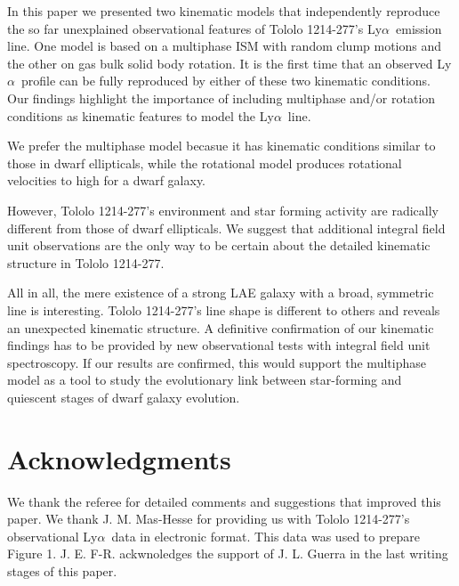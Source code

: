 \documentclass[a4,useAMS,usenatbib,usegraphicx]{mn2e}
\newcommand{\tol}{Tololo 1214-277}
\newcommand{\lya}{Ly$\alpha$}
\begin{document}
In this paper we presented two kinematic models that independently
reproduce the so far unexplained observational features of \tol's
\lya\ emission line.  
One model is based on a multiphase ISM with random clump motions and
the other on gas bulk solid body rotation. 
It is the first time that an observed \lya\ profile can be fully
reproduced by either of these two kinematic conditions.
Our findings highlight the importance of including multiphase and/or
rotation conditions as kinematic features to model the \lya\ line.

We prefer the multiphase model becasue it has kinematic
conditions similar to those in dwarf ellipticals, while the
rotational model produces rotational velocities to high for a dwarf
galaxy.  

However, \tol's environment and star forming activity are radically
different from those of dwarf ellipticals.
We suggest that additional integral field unit observations are the
only way to be certain about the detailed kinematic structure in \tol.

All in all, the mere existence of a strong LAE galaxy with a broad,
symmetric line is interesting. 
\tol's line shape is different to others and reveals an unexpected
kinematic structure.
A definitive confirmation of our kinematic findings has
to be provided by new observational tests with integral field unit
spectroscopy. 
If our results are confirmed, this would support the multiphase model
as a tool to study the evolutionary link between star-forming and
quiescent stages of dwarf galaxy evolution.   
 
\section*{Acknowledgments}
We thank the referee for detailed comments and suggestions that
improved this paper. 
We thank J. M. Mas-Hesse for providing us with \tol's observational
\lya\ data \citep{mashesse03} in electronic format. This data was
used to prepare Figure 1.
J. E. F-R. ackwnoledges the support of J. L. Guerra in the last
writing stages of this paper.
\end{document}
